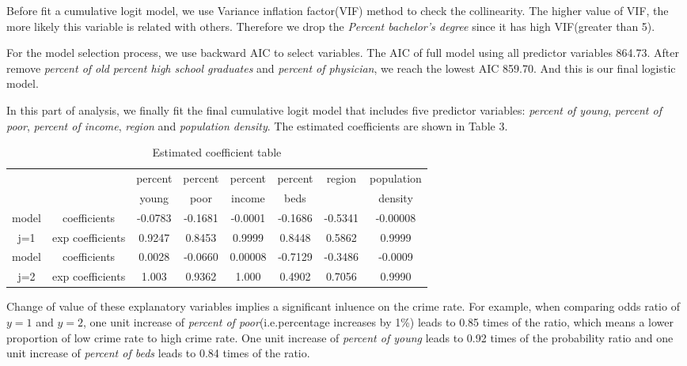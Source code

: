 \documentclass[oneside,11pt]{homework}
\begin{document}
Before fit a cumulative logit model, we use Variance inflation factor(VIF) method to check the collinearity. The higher value of VIF, the more likely this variable is related with others. Therefore we drop the \textit{Percent bachelor’s degree} since it has high VIF(greater than 5).\par

For the model selection process, we use backward AIC to select variables. The AIC of full model using all predictor variables 864.73. After remove \textit{percent of old} \textit{percent high school graduates} and \textit{percent of physician}, we reach the lowest AIC 859.70. And this is our final logistic model.

In this part of analysis, we finally fit the final cumulative logit model that includes five predictor variables: \textit{percent of young}, \textit{percent of poor}, \textit{percent of income}, \textit{region} and \textit{population density}. The estimated coefficients are shown in Table 3.\par


\begin{table}[H]
\centering
\begin{tabular}{|c|c|c|c|c|c|c|c|}
\hline
\hline
\multicolumn{2}{|c|}{}&percent & percent & percent & percent & region & population\\
\multicolumn{2}{|c|}{}&young   & poor    & income  & beds    &        & density  \\
\hline
model&coefficients & -0.0783 & -0.1681 & -0.0001 & -0.1686 & -0.5341 & -0.00008 \\
\cline{2-8}
j=1&exp coefficients & 0.9247 &  0.8453 &  0.9999 & 0.8448 & 0.5862 &  0.9999 \\
\hline\hline
model&coefficients & 0.0028 & -0.0660 & 0.00008 & -0.7129 & -0.3486 & -0.0009 \\
\cline{2-8}
j=2&exp coefficients & 1.003 &  0.9362 &  1.000 & 0.4902 & 0.7056 &  0.9990 \\
\hline
\end{tabular}
\caption{Estimated coefficient table}
\end{table}
\par


Change of value of these explanatory variables implies a significant inluence on the crime rate. For example, when comparing odds ratio of $y=1$ and $y=2$, one unit increase of \textit{percent of poor}(i.e.percentage increases by 1\%) leads to 0.85 times of the ratio, which means a lower proportion of low crime rate to high crime rate. One unit increase of \textit{percent of young} leads to 0.92 times of the probability ratio and one unit increase of \textit{percent of beds} leads to 0.84 times of the ratio.
\end{document}
